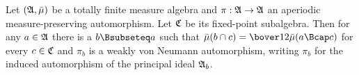  Let $(\frak A,\bar\mu)$ be a totally finite
measure algebra and $\pi:\frak A\to\frak A$ an
aperiodic measure-preserving
automorphism.   Let $\frak C$ be its fixed-point subalgebra.
Then for any $a\in\frak A$ there is a $b\Bsubseteq a$ such that
$\bar\mu(b\cap c)=\bover12\bar\mu(a\Bcap c)$ for every $c\in\frak C$
and $\pi_b$ is a weakly von Neumann automorphism,
writing $\pi_b$ for the induced automorphism of the principal ideal
$\frak A_b$.
     
     
